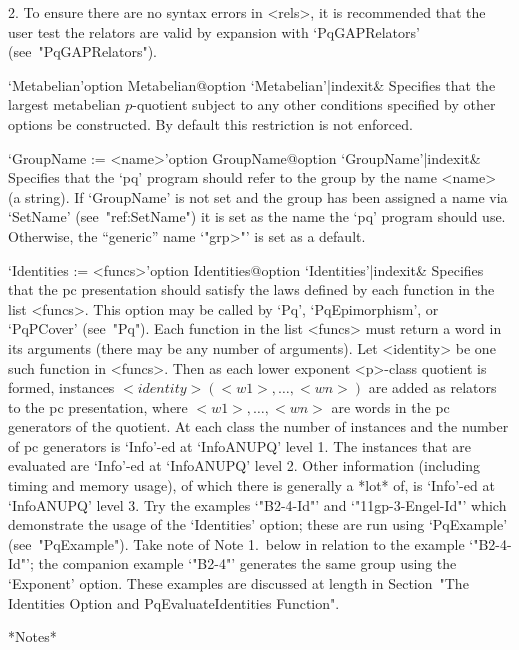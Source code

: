 \item{2.}
To ensure there are no syntax errors in <rels>, it  is  recommended  that
the user test the relators are valid by  expansion  with  `PqGAPRelators'
(see~"PqGAPRelators").

\endlist

\>`Metabelian'{option Metabelian}@{option `Metabelian'|indexit}&
Specifies that the largest metabelian $p$-quotient subject to  any  other
conditions specified by other options be  constructed.  By  default  this
restriction is not enforced.

\>`GroupName := <name>'{option GroupName}@{option `GroupName'|indexit}&
Specifies that the `pq' program should refer to the  group  by  the  name
<name> (a string). If `GroupName' is not  set  and  the  group  has  been
assigned a name via `SetName' (see~"ref:SetName") it is set as  the  name
the `pq' program should use. Otherwise, the ``generic''  name  `"\<grp>"'
is set as a default.

\>`Identities := <funcs>'{option Identities}@{option `Identities'|indexit}&
Specifies that the pc presentation should satisfy  the  laws  defined  by
each function in the list <funcs>. This option may  be  called  by  `Pq',
`PqEpimorphism', or `PqPCover' (see~"Pq").  Each  function  in  the  list
<funcs> must return a word in its arguments (there may be any  number  of
arguments). Let <identity> be one such function in <funcs>. Then as  each
lower exponent <p>-class quotient is formed, instances  $<identity>(<w1>,
\dots, <wn>)$ are added as relators to the pc presentation, where  $<w1>,
\dots, <wn>$ are words in the pc generators  of  the  quotient.  At  each
class the number  of  instances  and  the  number  of  pc  generators  is
`Info'-ed at `InfoANUPQ' level 1. The instances that  are  evaluated  are
`Info'-ed at `InfoANUPQ' level 2. Other information (including timing and
memory usage), of which there is generally a *lot* of,  is  `Info'-ed  at
`InfoANUPQ' level 3. Try the examples `"B2-4-Id"' and `"11gp-3-Engel-Id"' 
which demonstrate the usage of the `Identities'  option;  these  are  run
using `PqExample'  (see~"PqExample").  Take  note  of  Note  1.~below  in
relation to the  example  `"B2-4-Id"';  the  companion  example  `"B2-4"'
generates the same group using the `Exponent' option. These examples  are
discussed   at   length   in   Section~"The   Identities    Option    and
PqEvaluateIdentities Function".

*Notes*

\beginlist%

